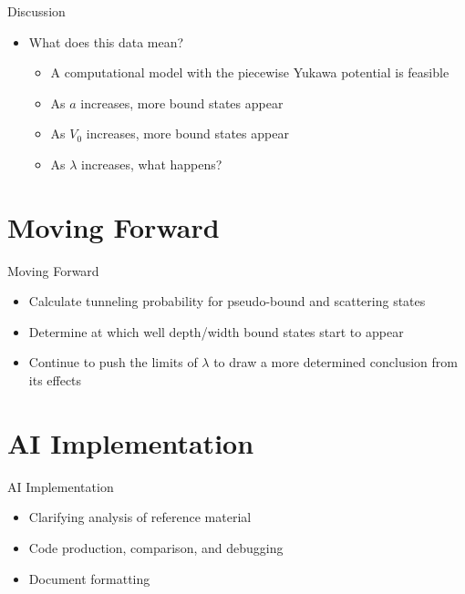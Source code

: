 \documentclass{beamer}
\begin{document}
\begin{frame}{Discussion}
    \begin{itemize}[<+-| alert@+>]
        \item What does this data mean?
        \begin{itemize}
            \item A computational model with the piecewise Yukawa potential is feasible
            \item As $a$ increases, more bound states appear
            \item As $V_0$ increases, more bound states appear
            \item As $\lambda$ increases, what happens?
        \end{itemize}
    \end{itemize}
\end{frame}


\section{Moving Forward}

\begin{frame}{Moving Forward}
    \begin{itemize}[<+-| alert@+>]
        \item Calculate tunneling probability for pseudo-bound and scattering states
        \item Determine at which well depth/width bound states start to appear
        \item Continue to push the limits of $\lambda$ to draw a more determined conclusion from its effects
    \end{itemize}
\end{frame}


\section{AI Implementation}

\begin{frame}{AI Implementation}
    \begin{itemize}[<+-| alert@+>]
        \item Clarifying analysis of reference material
        \item Code production, comparison, and debugging
        \item Document formatting
    \end{itemize}
\end{frame}
\end{document}
